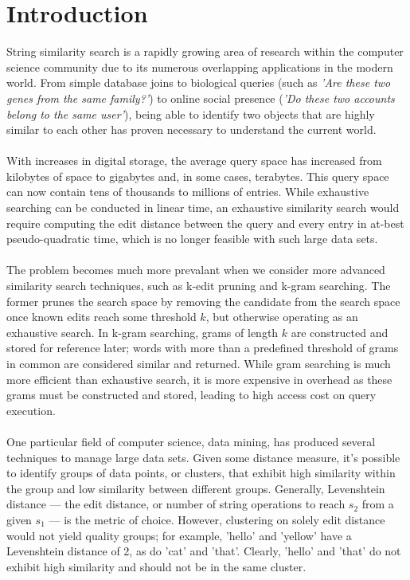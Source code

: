 \documentclass[pdftex,12pt,letter]{article}
\begin{document}
\section{Introduction}
String similarity search is a rapidly growing area of research within the computer science community due to its numerous overlapping applications in the modern world. From simple database joins to biological queries (such as \textit{'Are these two genes from the same family?'}) to online social presence (\textit{'Do these two accounts belong to the same user'}), being able to identify two objects that are highly similar to each other has proven necessary to understand the current world. \\
\\
With increases in digital storage, the average query space has increased from kilobytes of space to gigabytes and, in some cases, terabytes. This query space can now contain tens of thousands to millions of entries. While exhaustive searching can be conducted in linear time, an exhaustive similarity search would require computing the edit distance between the query and every entry in at-best pseudo-quadratic time, which is no longer feasible with such large data sets.\\
\\
The problem becomes much more prevalant when we consider more advanced similarity search techniques, such as k-edit pruning and k-gram searching. The former prunes the search space by removing the candidate from the search space once known edits reach some threshold $k$, but otherwise operating as an exhaustive search. In k-gram searching, grams of length $k$ are constructed and stored for reference later; words with more than a predefined threshold of grams in common are considered similar and returned. While gram searching is much more efficient than exhaustive search, it is more expensive in overhead as these grams must be constructed and stored, leading to high access cost on query execution.\\
\\
One particular field of computer science, data mining, has produced several techniques to manage large data sets. Given some distance measure, it's possible to identify groups of data points, or clusters, that exhibit high similarity within the group and low similarity between different groups. Generally, Levenshtein distance — the edit distance, or number of string operations to reach $s_2$ from a given $s_1$ — is the metric of choice. However, clustering on solely edit distance would not yield quality groups; for example, 'hello' and 'yellow' have a Levenshtein distance of 2, as do 'cat' and 'that'. Clearly, 'hello' and 'that' do not exhibit high similarity and should not be in the same cluster.\\
\end{document}
